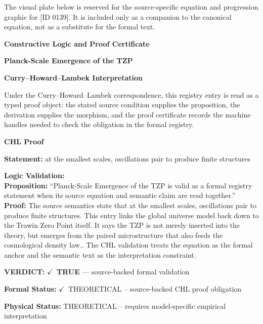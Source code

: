 \begingroup\footnotesize\sloppy
The visual plate below is reserved for the source-specific equation and progression graphic for [ID 0139]. It is included only as a companion to the canonical equation, not as a substitute for the formal text.
\par\endgroup
\ifTZPDarkEdition
{}
\fi

\clearpage
\begingroup\tzpsupportsetup
\noindent\textbf{\fontsize{10.8pt}{12.8pt}\selectfont [ID 0139] Constructive Logic and Proof Certificate}\par
\noindent\textbf{\fontsize{10pt}{12pt}\selectfont Planck-Scale Emergence of the TZP}\par
\vspace{0.45em}
\begingroup
\footnotesize
\setlength{\parskip}{0.22em}
\setlength{\parindent}{0pt}
\noindent\textbf{Curry--Howard--Lambek Interpretation}\par
Under the Curry--Howard--Lambek correspondence, this registry entry is read as a typed proof
object: the stated source condition supplies the proposition, the derivation supplies the
morphism, and the proof certificate records the machine handles needed to check the obligation
in the formal registry.

\vspace{0.45em}
\noindent\textbf{CHL Proof}\par
\textbf{Statement:} at the smallest scales, oscillations pair to produce finite structures

\textbf{Logic Validation:}\\
\textbf{Proposition:} ``Planck-Scale Emergence of the TZP is valid as a formal registry statement when its
source equation and semantic claim are read together.''\\
\textbf{Proof:} The source semantics state that at the smallest scales, oscillations pair to produce
finite structures. This entry links the global universe model back down to the Trawin
Zero Point itself. It says the TZP is not merely inserted into the theory, but emerges
from the paired microstructure that also feeds the cosmological density law.. The CHL
validation treats the equation as the formal anchor and the semantic text as the
interpretation constraint.

\textbf{VERDICT:} \ensuremath{\checkmark}\ \textbf{TRUE} --- source-backed formal validation

\textbf{Formal Status:} \ensuremath{\checkmark}\ THEORETICAL -- source-backed CHL proof obligation

\textbf{Physical Status:} THEORETICAL -- requires model-specific empirical interpretation
\par\vspace{0.45em}
\par
\ifTZPDarkEdition
{}
\fi
\endgroup
\endgroup
